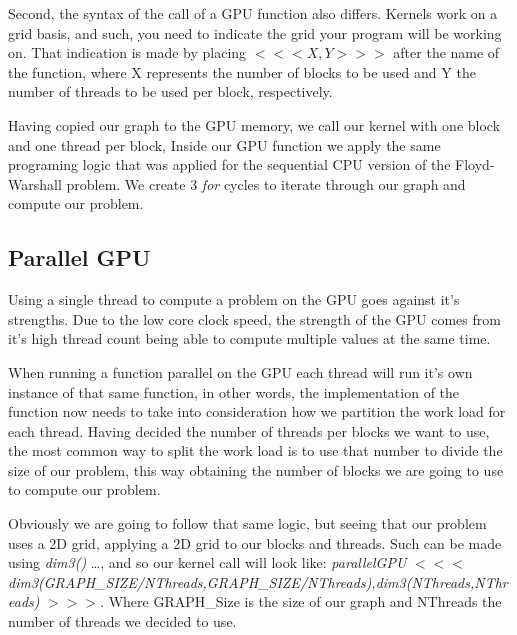\documentclass[runningheads]{llncs}
\begin{document}
Second, the syntax of the call of a GPU function also differs. Kernels work on a grid basis, and such, you need to indicate the grid your program will be working on. 
That indication is made by placing
\begin{math} <<< X, Y >>> \end{math}
after the name of the function, where X represents the number of blocks to be used and Y the number of threads to be used per block, respectively. 

Having copied our graph to the GPU memory, we call our kernel with one block and one thread per block, 
Inside our GPU function we apply the same programing logic that was applied for the sequential CPU version of the Floyd-Warshall problem. 
We create 3 \textit{for} cycles to iterate through our graph and compute our problem.


\subsection{Parallel GPU}
Using a single thread to compute a problem on the GPU goes against it's strengths. 
Due to the low core clock speed, the strength of the GPU comes from it's high thread count being able to compute multiple values at the same time. 

When running a function parallel on the GPU each thread will run it's own instance of that same function, 
in other words, the implementation of the function now needs to take into consideration how we partition the work load for each thread. 
Having decided the number of threads per blocks we want to use, the most common way to split the work load is to 
use that number to divide the size of our problem, this way obtaining the number of blocks we are going to use to compute our problem. 

Obviously we are going to follow that same logic, but seeing that our problem uses a 2D grid, 
applying a 2D grid to our blocks and threads. Such can be made using \textit{dim3()} \dots, 
and so our kernel call will look like: \newline\small{\textit{parallelGPU}
\begin{math} <<< \end{math}
\textit{dim3(GRAPH\_SIZE/NThreads,GRAPH\_SIZE/NThreads),\newline dim3(NThreads,NThreads)}
\begin{math} >>> \end{math}}. \newline
Where GRAPH\_Size is the size of our graph and NThreads the number of threads we decided to use.
\end{document}
